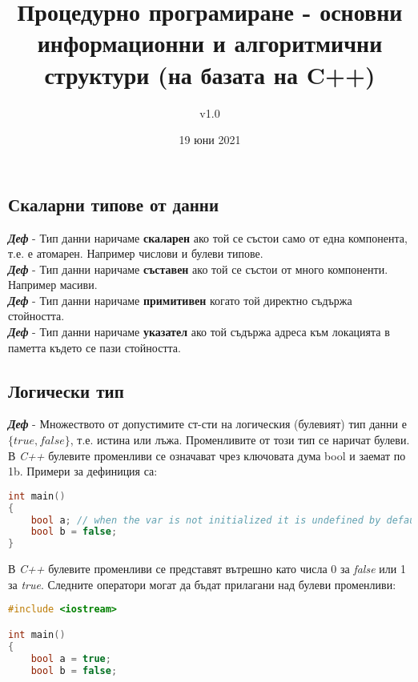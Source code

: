 \documentclass[fleqn,12pt]{article}
\title{Процедурно програмиране - основни информационни и алгоритмични структури (на базата на C++)}
\author{v1.0}
\date{19 юни 2021}
\begin{document}
\maketitle

\tableofcontents
\pagebreak

\begin{flushleft}

\section{Скаларни типове от данни}

\textit{\textbf{Деф}} - Тип данни наричаме \textbf{скаларен} ако той се състои само от една компонента, т.е. е атомарен. Например числови и булеви типове. \\
\textit{\textbf{Деф}} - Тип данни наричаме \textbf{съставен} ако той се състои от много компоненти. Например масиви. \\
\textit{\textbf{Деф}} - Тип данни наричаме \textbf{примитивен} когато той директно съдържа стойността. \\
\textit{\textbf{Деф}} - Тип данни наричаме \textbf{указател} ако той съдържа адреса към локацията в паметта където се пази стойността. \\

\subsection{Логически тип}

\textit{\textbf{Деф}} - Множеството от допустимите ст-сти на логическия (булевият) тип данни е $\{true, false\}$, т.е. истина или лъжа. 
Променливите от този тип се наричат булеви.
\bigbreak
В \textit{C++} булевите променливи се означават чрез ключовата дума bool и заемат по 1b. Примери за дефиниция са:

\begin{lstlisting}[language=C++, caption=Bool variables]
int main()
{
    bool a; // when the var is not initialized it is undefined by default
    bool b = false;
}
\end{lstlisting}

В \textit{C++} булевите променливи се представят вътрешно като числа 0 за \textit{false} или 1 за \textit{true}.
Следните оператори могат да бъдат прилагани над булеви променливи:

\begin{lstlisting}[language=C++, caption=Bool operators]
#include <iostream>

int main()
{
    bool a = true;
    bool b = false;


\end{lstlisting}
\end{flushleft}
\end{document}
